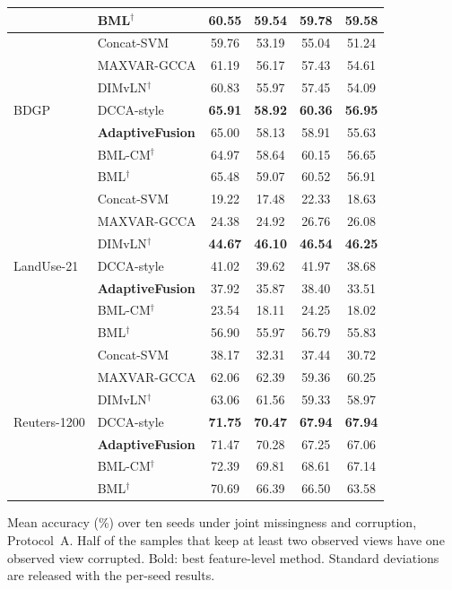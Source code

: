 \begin{table}[!t]
\begin{tabular}{llcccc}
 & BML$^\dagger$ & 60.55 & 59.54 & 59.78 & 59.58 \\
\midrule
\multirow{7}{*}{BDGP} & Concat-SVM & 59.76 & 53.19 & 55.04 & 51.24 \\
 & MAXVAR-GCCA & 61.19 & 56.17 & 57.43 & 54.61 \\
 & DIMvLN$^\dagger$ & 60.83 & 55.97 & 57.45 & 54.09 \\
 & DCCA-style & \textbf{65.91} & \textbf{58.92} & \textbf{60.36} & \textbf{56.95} \\
 & \textbf{AdaptiveFusion} & 65.00 & 58.13 & 58.91 & 55.63 \\
\cmidrule(lr){2-6}
 & BML-CM$^\dagger$ & 64.97 & 58.64 & 60.15 & 56.65 \\
 & BML$^\dagger$ & 65.48 & 59.07 & 60.52 & 56.91 \\
\midrule
\multirow{7}{*}{LandUse-21} & Concat-SVM & 19.22 & 17.48 & 22.33 & 18.63 \\
 & MAXVAR-GCCA & 24.38 & 24.92 & 26.76 & 26.08 \\
 & DIMvLN$^\dagger$ & \textbf{44.67} & \textbf{46.10} & \textbf{46.54} & \textbf{46.25} \\
 & DCCA-style & 41.02 & 39.62 & 41.97 & 38.68 \\
 & \textbf{AdaptiveFusion} & 37.92 & 35.87 & 38.40 & 33.51 \\
\cmidrule(lr){2-6}
 & BML-CM$^\dagger$ & 23.54 & 18.11 & 24.25 & 18.02 \\
 & BML$^\dagger$ & 56.90 & 55.97 & 56.79 & 55.83 \\
\midrule
\multirow{7}{*}{Reuters-1200} & Concat-SVM & 38.17 & 32.31 & 37.44 & 30.72 \\
 & MAXVAR-GCCA & 62.06 & 62.39 & 59.36 & 60.25 \\
 & DIMvLN$^\dagger$ & 63.06 & 61.56 & 59.33 & 58.97 \\
 & DCCA-style & \textbf{71.75} & \textbf{70.47} & \textbf{67.94} & \textbf{67.94} \\
 & \textbf{AdaptiveFusion} & 71.47 & 70.28 & 67.25 & 67.06 \\
\cmidrule(lr){2-6}
 & BML-CM$^\dagger$ & 72.39 & 69.81 & 68.61 & 67.14 \\
 & BML$^\dagger$ & 70.69 & 66.39 & 66.50 & 63.58 \\
\bottomrule
\end{tabular}
\par\smallskip
\parbox{\linewidth}{\scriptsize Mean accuracy (\%) over ten seeds under joint missingness and corruption, Protocol~A. Half of the samples that keep at least two observed views have one observed view corrupted. Bold: best feature-level method. Standard deviations are released with the per-seed results.}
\end{table}

